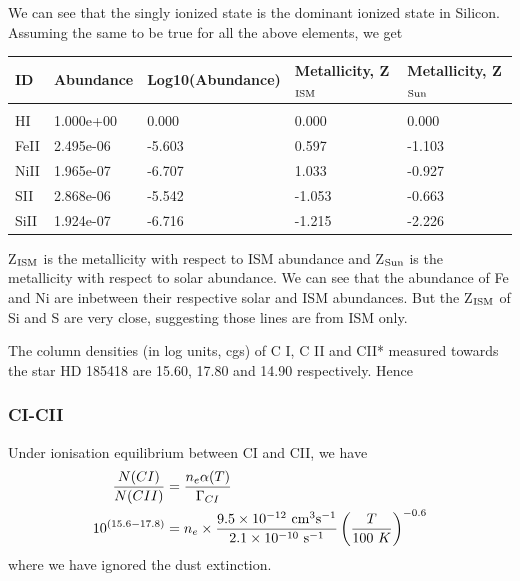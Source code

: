 \documentclass{jhwhw}
\begin{document}
We can see that the singly ionized state is the dominant ionized state in Silicon. Assuming the same to be true for all the above elements, we get


\begin{table}[H]
\centering
\begin{tabular}{l|l|l|l|l}
ID & Abundance & Log10(Abundance) & Metallicity, Z$_{\rm{ISM}}$ & Metallicity, Z$_{\rm{Sun}}$\\
\hline & & & &\\
HI & 1.000e+00 & 0.000 & 0.000 & 0.000\\
FeII & 2.495e-06 & -5.603 & 0.597 & -1.103\\
NiII & 1.965e-07 & -6.707 & 1.033 & -0.927\\
SII & 2.868e-06 & -5.542 & -1.053 & -0.663\\
SiII & 1.924e-07 & -6.716 & -1.215 & -2.226\\
\end{tabular}
\end{table}

Z$_{\rm{ISM}}$ is the metallicity with respect to ISM abundance and Z$_{\rm{Sun}}$ is the metallicity with respect to solar abundance. We can see that the abundance of Fe and Ni are inbetween their respective solar and ISM abundances. But the Z$_{\rm{ISM}}$ of Si and S are very close, suggesting those lines are from ISM only.














\solution
The column densities (in log
units, cgs) of C I, C II and CII* measured towards the star HD 185418 are
15.60, 17.80 and 14.90 respectively. Hence

\subsubsection{CI-CII}
Under ionisation equilibrium between CI and CII, we have
\begin{align}
\frac{N(CI)}{N(CII)} &= \frac{n_e \alpha(T)}{\Gamma_{CI}}\\
10^{(15.6-17.8)} &= n_e  \times\frac{ 9.5 \times 10^{-12} ~\rm{cm^3s^{-1}}}{2.1 \times 10^{-10} ~\rm{s}^{-1}} \left(  \frac{T}{100 ~K} \right)^{-0.6}
\end{align}
where we have ignored the dust extinction.
\end{document}
